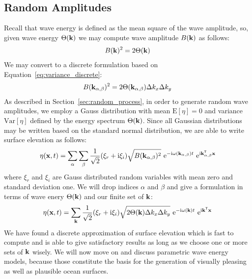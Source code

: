 \subsection{Random Amplitudes}
\label{sec:random_amplitudes}
Recall that wave energy is defined as the mean square of the wave amplitude, so,
given wave energy $\Theta(\mathbf{k})$ we may compute wave amplitude 
$B(\mathbf{k})$ as follows:
\begin{equation}
 B(\mathbf{k})^2 = 2\Theta(\mathbf{k})
\end{equation}
We may convert to a discrete formulation based on 
Equation~\ref{eq:variance_discrete}:
\begin{equation}
 B(\mathbf{k}_{\alpha,\beta})^2 = 2\Theta(\mathbf{k}_{\alpha,\beta})\Delta k_x 
\Delta k_y
\end{equation}
As described in Section~\ref{sec:random_process}, in order to generate random 
wave amplitudes, we employ a Gauss distribution with mean $\mathrm{E}[\eta] 
= 0$ and variance $\mathrm{Var}[\eta]$ defined by the energy spectrum
$\Theta(\mathbf{k})$. Since all Gaussian distributions may be written based on 
the standard normal distribution, we are able to write surface elevation as 
follows:
\begin{equation}
 \eta(\mathbf{x}, t) = 
\sum_{\alpha}\sum_{\beta}\frac{1}{\sqrt{2}}(\xi_r+\mathrm{i}\xi_i)\sqrt{B(\mathbf{
k}_{\alpha,\beta})^2}~\mathrm{e}^{-\mathrm{i}\omega(\mathbf{k}_{\alpha,\beta}) 
t}~\mathrm{e}^{\mathrm{i}\mathbf{k}_{\alpha,\beta}^{\mathsf{T}}\mathbf{x}}
\end{equation}
where $\xi_r$ and $\xi_i$ are Gauss distributed random variables with mean zero 
and standard deviation one. We will drop indices $\alpha$ and $\beta$ and give 
a formulation in terms of wave enery $\Theta(\mathbf{k})$ and our finite set of 
\wavevectors $\mathbf{k}$:
\begin{equation}
\label{eq:surface_elevation_discrete}
 \eta(\mathbf{x}, t) = 
\sum_{\mathbf{k}}\frac{1}{\sqrt{2}}(\xi_r+\mathrm{i}\xi_i)
\sqrt{2\Theta(\mathbf{k})\Delta k_x \Delta k_y} 
~\mathrm{e}^{-\mathrm{i}\omega(\mathbf{k})t}
~\mathrm{e}^{\mathrm{i}\mathbf{k}^{\mathsf{T}}\mathbf{x}}
\end{equation}
%
We have found a discrete approximation of surface elevation which is fast to 
compute and is able to give satisfactory results as long as we choose one or 
more sets of \wavevectors $\mathbf{k}$ wisely. We will now move on and discuss
parametric wave energy models, because those constitute the basis for the
generation of visually pleasing as well as plausible ocean surfaces.
%
